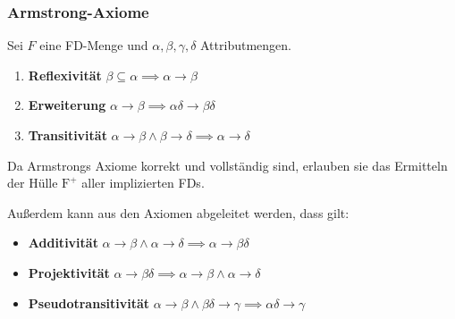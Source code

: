 \documentclass[a4paper, 11pt, accentcolor = tud3b]{tudreport}
\begin{document}
                \subsubsection{Armstrong-Axiome} %
                	Sei \( F \) eine FD-Menge und \( \alpha, \beta, \gamma, \delta \) Attributmengen.
                    \begin{enumerate}
                    	\item \textbf{Reflexivität} \( \beta \subseteq \alpha \implies \alpha \rightarrow \beta \)
                    	\item \textbf{Erweiterung} \( \alpha \rightarrow \beta \implies \alpha\delta \rightarrow \beta\delta \)
                    	\item \textbf{Transitivität} \( \alpha \rightarrow \beta \land \beta \rightarrow \delta \implies \alpha \rightarrow \delta \)
                    \end{enumerate}
                	Da Armstrongs Axiome korrekt und vollständig sind, erlauben sie das Ermitteln der Hülle \(\text{F}^+\) aller implizierten FDs.
                	
                	Außerdem kann aus den Axiomen abgeleitet werden, dass gilt:
                	\begin{itemize}
                		\item \textbf{Additivität} \( \alpha \rightarrow \beta \land \alpha \rightarrow \delta \implies \alpha \rightarrow \beta\delta \)
                		\item \textbf{Projektivität} \( \alpha \rightarrow \beta\delta \implies \alpha \rightarrow \beta \land \alpha \rightarrow \delta \)
                		\item \textbf{Pseudotransitivität} \( \alpha \rightarrow \beta \land \beta\delta \rightarrow \gamma \implies \alpha\delta \rightarrow \gamma \)
                	\end{itemize}
\end{document}
